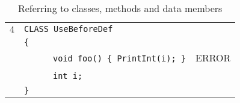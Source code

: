 \documentclass{article}
\begin{document}
\begin{table}[h]
\begin{tabular}{|l|l|l|}
\hline
 $4$ & \verb"CLASS UseBeforeDef"                 &    \\
     & \verb"{"                                  &    \\
     & ~ ~ ~ ~\verb"void foo() { PrintInt(i); }" & ERROR \\
     & ~ ~ ~ ~\verb"int i;"                      &    \\
     & \verb"}"                                  &    \\
\hline
\end{tabular}
\caption{Referring to classes, methods and data members
\label{Table_Code_Examples_Use_Before_Def}}
\end{table}
\newpage
\end{document}

